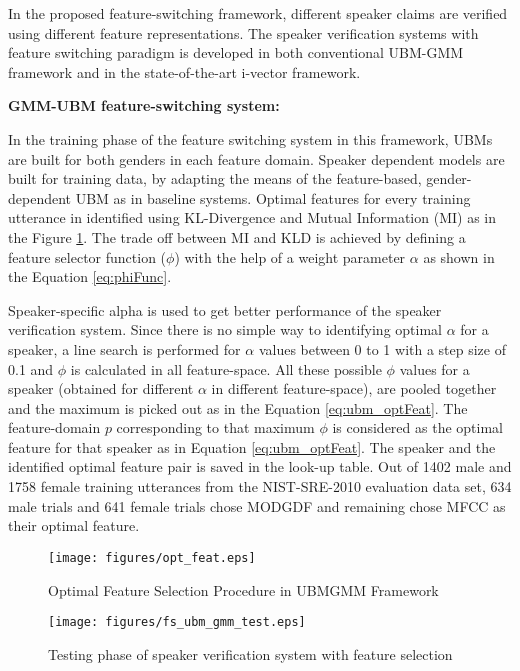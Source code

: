 \documentclass{article}
\begin{document}
In the proposed feature-switching framework, different speaker claims are verified using different feature representations. The speaker verification systems with feature switching paradigm is developed in both conventional UBM-GMM framework and in the state-of-the-art i-vector framework.

\textbf{GMM-UBM feature-switching system:}

In the training phase of the feature switching system in this framework, UBMs are built for both genders in each feature domain. Speaker dependent models are built for training data, by adapting the means of the feature-based, gender-dependent UBM as in baseline systems. Optimal features for every training utterance in identified using KL-Divergence and Mutual Information (MI) as  in the Figure \ref{fig:fs_ubm_train}. The trade off between MI and KLD is achieved by defining a feature selector function ($\phi$) with the help of a weight parameter $\alpha$ as shown in the Equation \ref{eq:phiFunc}. 

Speaker-specific alpha is used to get better performance of the speaker verification system. Since there is no simple way to identifying optimal $\alpha$ for a speaker, a line search is performed for $\alpha$ values between 0 to 1 with a step size of 0.1 and $\phi$ is calculated in all feature-space. All these possible $\phi$ values for a speaker (obtained for different $\alpha$ in different feature-space), are pooled together and the maximum is picked out as in the Equation \ref{eq:ubm_optFeat}. The feature-domain $p$ corresponding to that maximum $\phi$ is considered as the optimal feature for that speaker as in Equation \ref{eq:ubm_optFeat}. The speaker and the identified optimal feature pair is saved in the look-up table. Out of 1402 male  and 1758 female training utterances from the NIST-SRE-2010 evaluation data set, 634 male trials and 641 female trials chose MODGDF and remaining chose MFCC as their optimal feature.

\begin{figure}[h!tb]
\texttt{[image: figures/opt\_feat.eps]}
\caption{Optimal Feature Selection Procedure in UBMGMM Framework}
\label{fig:fs_ubm_train}
\end{figure}

	\begin{figure}[h!tb]
	\texttt{[image: figures/fs\_ubm\_gmm\_test.eps]}
	\caption[blah]{Testing phase of speaker verification system with feature selection } 
	\label{fig:fs_ubm_test}
	\end{figure}
\end{document}
